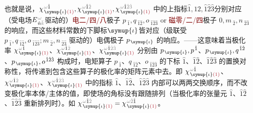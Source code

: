 也就是说，$\chi^{\;\! \mathcolor{gray}{\omega} \hat{1}}_{\;\! \symup{\iota} \textcolor{Maroon}{(1)}},\chi^{\;\! \mathcolor{gray}{\omega} \hat{1} \mathcolor{gray}{\hat{2}}}_{\;\! \symup{\iota} \textcolor{Maroon}{(1)}},\chi^{\;\! \mathcolor{gray}{\omega} \hat{1} \mathcolor{gray}{\hat{2} \hat{3}}}_{\;\! \symup{\iota} \textcolor{Maroon}{(1)}}$ 中的上指标$\hat{1},\hat{1} \hat{2},\hat{1} \hat{2} \hat{3}$分别对应（受电场$E^{\;\!\mathcolor{gray}{\omega}}_{\;\! \hat{n} \mathcolor{gray}{\bar{k}}}$驱动的）\textcolor{Maroon}{电二/四/八}极子 $p_{\;\! \hat{1}}, q_{\;\! \hat{1} \hat{2}}, o_{\;\! \hat{1} \hat{2} \hat{3}}$ or \textcolor{Maroon}{磁零/二/四}极子 $0, m_{\;\! \hat{2}}, n_{\;\! \hat{2} \hat{3}}$ 的响应，而这些材料常数的下脚标$\symup{\iota}$皆对应（级联受 $p_{\;\! \hat{1}}, q_{\;\! \hat{1} \hat{2}}, o_{\;\! \hat{1} \hat{2} \hat{3}}; m_{\;\! \hat{2}}, n_{\;\! \hat{2} \hat{3}}$ 驱动的）电偶极子 $p_{\;\! \symup{\iota}}$ 的响应。——这意味着当极化率 $\chi^{\;\! \mathcolor{gray}{\omega} \hat{1}}_{\;\! \symup{\iota} \textcolor{Maroon}{(1)}}$、$\chi^{\;\! \mathcolor{gray}{\omega} \hat{1} \mathcolor{gray}{\hat{2}}}_{\;\! \symup{\iota} \textcolor{Maroon}{(1)}}$、$\chi^{\;\! \mathcolor{gray}{\omega} \hat{1} \mathcolor{gray}{\hat{2} \hat{3}}}_{\;\! \symup{\iota} \textcolor{Maroon}{(1)}}$ 分别由 $p_{\;\! \symup{\iota}}, p^{\;\! \hat{1}}$、$p_{\;\! \symup{\iota}}, q^{\;\! \hat{1} \hat{2}}$、$p_{\;\! \symup{\iota}}, o^{\;\! \hat{1} \hat{2} \hat{3}}$ 构成时，电矩算子 $p_{\;\! \hat{1}}$、$ q_{\;\! \hat{1} \hat{2}}$、$ o_{\;\! \hat{1} \hat{2} \hat{3}}$ 的下标 $\hat{1}$、$\hat{1} \hat{2}$、$\hat{1} \hat{2} \hat{3}$ 的置换对称性，将传递到包含这些算子的极化率的矩阵元素中去。即 $\chi^{\;\! \mathcolor{gray}{\omega} \hat{1}}_{\;\! \symup{\iota} \textcolor{Maroon}{(1)}}$、$\chi^{\;\! \mathcolor{gray}{\omega} \hat{1} \mathcolor{gray}{\hat{2}}}_{\;\! \symup{\iota} \textcolor{Maroon}{(1)}}$、$\chi^{\;\! \mathcolor{gray}{\omega} \hat{1} \mathcolor{gray}{\hat{2} \hat{3}}}_{\;\! \symup{\iota} \textcolor{Maroon}{(1)}}$ 中的指标 $\hat{1}$、$\hat{1} \hat{2}$、$\hat{1} \hat{2} \hat{3}$ 内部可以两两交换顺序，而不改变极化率本体/主体的值，即使场的角标没有跟随排列（当极化率的张量元 $\hat{1}$、$\hat{1} \hat{2}$、$\hat{1} \hat{2} \hat{3}$ 重新排列时）。如 $\chi^{\;\! \mathcolor{gray}{\omega} \hat{1} \mathcolor{gray}{\hat{2}}}_{\;\! \symup{\iota} \textcolor{Maroon}{(1)}} = \chi^{\;\! \mathcolor{gray}{\omega} \mathcolor{gray}{\hat{2}} \hat{1}}_{\;\! \symup{\iota} \textcolor{Maroon}{(1)}}$。

